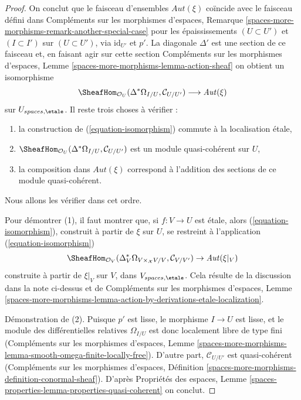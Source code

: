 \begin{proof}
\medskip\noindent
On conclut que le faisceau d'ensembles $\mathit{Aut}(\xi)$ coïncide avec
le faisceau défini dans
Compléments sur les morphismes d'espaces, Remarque
\ref{spaces-more-morphisms-remark-another-special-case}
pour les épaississements $(U \subset U')$ et $(I \subset I')$ sur
$(U \subset U')$, via $\text{id}_{U'}$ et $p'$.
La diagonale $\Delta'$ est une section de ce faisceau et, en faisant
agir sur cette section Compléments sur les morphismes d'espaces, Lemme
\ref{spaces-more-morphisms-lemma-action-sheaf}
on obtient un isomorphisme
\begin{equation}
\label{equation-isomorphism}
\SheafHom_{\mathcal{O}_U}(\Delta^*\Omega_{I/U}, \mathcal{C}_{U/U'})
\longrightarrow
\mathit{Aut}(\xi)
\end{equation}
sur $U_{spaces, \etale}$. Il reste trois choses à vérifier :
\begin{enumerate}
\item la construction de (\ref{equation-isomorphism})
commute à la localisation \'etale,
\item $\SheafHom_{\mathcal{O}_U}(\Delta^*\Omega_{I/U}, \mathcal{C}_{U/U'})$
est un module quasi-cohérent sur $U$,
\item la composition dans $\mathit{Aut}(\xi)$ correspond
à l'addition des sections de ce module quasi-cohérent.
\end{enumerate}
Nous allons les vérifier dans cet ordre.

\medskip\noindent
Pour démontrer (1), il faut montrer que, si $f : V \to U$ est \'etale,
alors (\ref{equation-isomorphism}), construit à partir de $\xi$ sur $U$,
se restreint à l'application (\ref{equation-isomorphism})
$$
\SheafHom_{\mathcal{O}_V}(
\Delta_V^*\Omega_{V \times_\mathcal{X} V/V}, \mathcal{C}_{V/V'}) \to
\mathit{Aut}(\xi|_V)
$$
construite à partir de $\xi|_V$ sur $V$, dans $V_{spaces, \etale}$.
Cela résulte de la discussion dans la note ci-dessus
et de Compléments sur les morphismes d'espaces, Lemme
\ref{spaces-more-morphisms-lemma-action-by-derivations-etale-localization}.

\medskip\noindent
Démonstration de (2). Puisque $p'$ est lisse, le morphisme $I \to U$ est lisse,
et le module des différentielles relatives $\Omega_{I/U}$ est donc
localement libre de type fini (Compléments sur les morphismes d'espaces, Lemme
\ref{spaces-more-morphisms-lemma-smooth-omega-finite-locally-free}).
D'autre part, $\mathcal{C}_{U/U'}$ est quasi-cohérent
(Compléments sur les morphismes d'espaces, Définition
\ref{spaces-more-morphisms-definition-conormal-sheaf}).
D'après Propriétés des espaces, Lemme
\ref{spaces-properties-lemma-properties-quasi-coherent}
on conclut.


\end{proof}
